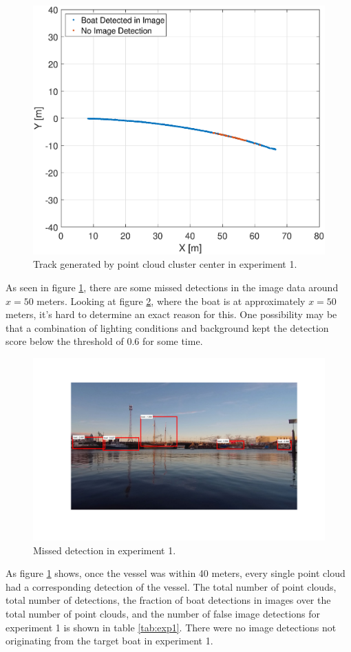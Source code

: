 \begin{figure}[H]
	\centering
	\includegraphics[width=.8\linewidth]{fig/exp_1_track.eps}
	\caption{Track generated by point cloud cluster center in experiment 1.}
	\label{fig:ex1_track}
\end{figure}
As seen in figure \ref{fig:ex1_track}, there are some missed detections in the image data around $x=50$ meters.
Looking at figure \ref{fig:ex1_50m}, where the boat is at approximately $x=50$ meters, it's hard to determine an exact reason for this. One possibility may be that a combination of lighting conditions and background kept the detection score below the threshold of 0.6 for some time.
\begin{figure}[H]
	\centering
	\includegraphics[width=\linewidth]{fig/exp1_bb_50m.png}
	\caption{Missed detection in experiment 1.}
	\label{fig:ex1_50m}
\end{figure}
As figure \ref{fig:ex1_track} shows, once the vessel was within 40 meters, every single point cloud had a corresponding detection of the vessel. The total number of point clouds, total number of detections, the fraction of boat detections in images over the total number of point clouds, and the number of false image detections for experiment 1 is shown in table \ref{tab:exp1}. There were no image detections not originating from the target boat in experiment 1.
